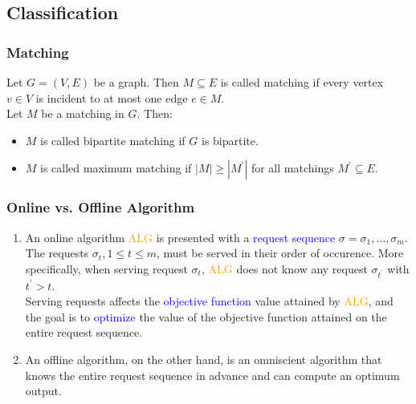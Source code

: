 \subsection{Classification}

\begin{frame}
    \frametitle{Matching}
    \begin{definition}
        Let $G = (V,E)$ be a graph. Then $M \subseteq E$ is called \alert{matching} if every vertex $v \in V$ is incident to at most one edge $e \in M$.\\
        \smallskip
        Let $M$ be a matching in $G$. Then:
        \begin{itemize}
            \item<1-> $M$ is called \alert{bipartite} matching if $G$ is bipartite.
            \item<1-> $M$ is called \alert{maximum} matching if $|M| \geq |M^\prime|$ for all matchings $M^\prime \subseteq E$.
        \end{itemize}
    \end{definition}
\end{frame}

\begin{frame}
    \frametitle{Online vs. Offline Algorithm}
    \begin{definition}
        \begin{enumerate}
            \item<1-> An \alert{online algorithm} \textcolor{orange}{ALG} is presented with a \textcolor{blue}{request sequence} $\sigma = \sigma_1, \dots, \sigma_m$. The requests $\sigma_t, 1 \leq t \leq m$, must be served in their order of occurence. More specifically, when serving request $\sigma_t$, \textcolor{orange}{ALG} does not know any request $\sigma_{t^\prime}$ with $t^\prime > t$.\\
            \smallskip
            Serving requests affects the \textcolor{blue}{objective function} value attained by \textcolor{orange}{ALG}, and the goal is to \textcolor{blue}{optimize} the value of the objective function attained on the entire request sequence.
            \item<2-> An \alert{offline algorithm}, on the other hand, is an omniscient algorithm that knows the entire request sequence in advance and can compute an optimum output.
        \end{enumerate}
    \end{definition}
\end{frame}

